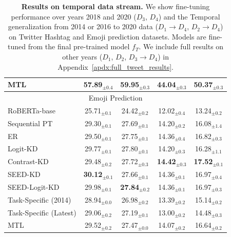 \begin{table}[]
{\begin{tabular}{@{}lcccc@{}}
MTL                    & 57.89$_{\pm 0.4}$ & 59.95$_{\pm 0.3}$  & 44.04$_{\pm 0.3}$ & 50.37$_{\pm 0.3}$ \\
\midrule
\multicolumn{5}{c}{Emoji Prediction}                                                                     \\ \midrule
RoBERTa-base           & 25.71$_{\pm 0.1}$ & 24.42$_{\pm 0.2}$  & 12.02$_{\pm 0.4}$ & 13.24$_{\pm 0.2}$ \\
Sequential PT          & 29.30$_{\pm 0.1}$ & 27.69$_{\pm 0.1}$  & 14.20$_{\pm 0.2}$ & 16.08$_{\pm 1.4}$ \\
ER                     & 29.50$_{\pm 0.1}$ & 27.75$_{\pm 0.1}$  & 14.36$_{\pm 0.4}$ & 16.82$_{\pm 0.3}$ \\
Logit-KD               & 29.77$_{\pm 0.1}$ & 27.80$_{\pm 0.1}$  & 14.20$_{\pm 0.3}$ & 16.28$_{\pm 1.1}$ \\
Contrast-KD            & 29.48$_{\pm 0.2}$ & 27.72$_{\pm 0.3}$  & \textbf{14.42$_{\pm 0.3}$} & \textbf{17.52$_{\pm 0.1}$} \\
SEED-KD                & \textbf{30.12$_{\pm 0.1}$} & 27.66$_{\pm 0.1}$  & 14.36$_{\pm 0.1}$ & 16.97$_{\pm 0.4}$ \\
SEED-Logit-KD          & 29.98$_{\pm 0.1}$ & \textbf{27.84$_{\pm 0.2}$}  & 14.36$_{\pm 0.1}$ & 16.97$_{\pm 0.3}$ \\ \midrule
Task-Specific (2014)   & 28.94$_{\pm 0.0}$ & 26.98$_{\pm 0.2}$  & 13.39$_{\pm 0.2}$ & 15.14$_{\pm 0.2}$ \\
Task-Specific (Latest) & 29.06$_{\pm 0.2}$ & 27.19$_{\pm 0.1}$  & 13.00$_{\pm 0.2}$ & 14.48$_{\pm 0.3}$ \\
MTL                    & 29.52$_{\pm 0.2}$ & 27.47$_{\pm 0.0}$  & 14.07$_{\pm 0.2}$ & 16.64$_{\pm0.2}$   \\  \bottomrule
\end{tabular}
}
\caption{\small \textbf{Results on temporal data stream.} We show fine-tuning performance over years 2018 and 2020 ($D_3$, $D_4$) and the Temporal generalization from 2014 or 2016 to 2020 data ($D_1\to D_4$, $D_2 \to D_4$) on Twitter Hashtag and Emoji prediction datasets. Models are fine-tuned from the final pre-trained model $f_T$. We include full results on other years ($D_1$, $D_2$, $D_3 \to D_4$) in Appendix~\ref{apdx:full_tweet_results}.
}
\label{tab:twitter}
\end{table}
